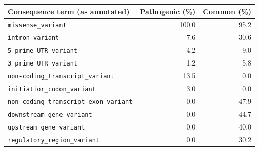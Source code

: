 \begin{tabular}{lrr}\toprule
Consequence term (as annotated) & Pathogenic (\%) & Common (\%)\\\midrule
\texttt{missense\_variant} & 100.0 & 95.2\\
\texttt{intron\_variant} & 7.6 & 30.6\\
\texttt{5\_prime\_UTR\_variant} & 4.2 & 9.0\\
\texttt{3\_prime\_UTR\_variant} & 1.2 & 5.8\\
\texttt{non-coding\_transcript\_variant} & 13.5 & 0.0\\
\texttt{initiatior\_codon\_variant} & 3.0 & 0.0\\
\texttt{non\_coding\_transcript\_exon\_variant} & 0.0 & 47.9\\
\texttt{downstream\_gene\_variant} & 0.0 & 44.7\\
\texttt{upstream\_gene\_variant} & 0.0 & 40.0\\
\texttt{regulatory\_region\_variant} & 0.0 & 30.2\\
\bottomrule\end{tabular}
